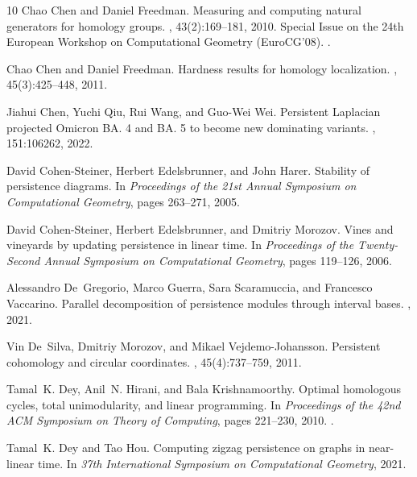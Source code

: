 \documentclass[10pt,a4paper]{amsart}
\theoremstyle{definition}
\theoremstyle{remark}
\begin{document}
\begin{thebibliography}{10}
Chao Chen and Daniel Freedman.
\newblock Measuring and computing natural generators for homology groups.
, 43(2):169--181, 2010.
\newblock Special Issue on the 24th European Workshop on Computational Geometry
  (EuroCG'08).
\newblock \href {https://doi.org/10.1016/j.comgeo.2009.06.004}
  {}.

Chao Chen and Daniel Freedman.
\newblock Hardness results for homology localization.
, 45(3):425--448, 2011.

Jiahui Chen, Yuchi Qiu, Rui Wang, and Guo-Wei Wei.
\newblock Persistent {L}aplacian projected {O}micron {BA. 4} and {BA. 5} to
  become new dominating variants.
, 151:106262, 2022.

David Cohen-Steiner, Herbert Edelsbrunner, and John Harer.
\newblock Stability of persistence diagrams.
\newblock In {\em Proceedings of the 21st Annual Symposium on Computational
  Geometry}, pages 263--271, 2005.

David Cohen-Steiner, Herbert Edelsbrunner, and Dmitriy Morozov.
\newblock Vines and vineyards by updating persistence in linear time.
\newblock In {\em Proceedings of the Twenty-Second Annual Symposium on
  Computational Geometry}, pages 119--126, 2006.

Alessandro De~Gregorio, Marco Guerra, Sara Scaramuccia, and Francesco
  Vaccarino.
\newblock Parallel decomposition of persistence modules through interval bases.
, 2021.

Vin De~Silva, Dmitriy Morozov, and Mikael Vejdemo-Johansson.
\newblock Persistent cohomology and circular coordinates.
, 45(4):737--759, 2011.

Tamal~K. Dey, Anil~N. Hirani, and Bala Krishnamoorthy.
\newblock Optimal homologous cycles, total unimodularity, and linear
  programming.
\newblock In {\em Proceedings of the 42nd ACM Symposium on Theory of
  Computing}, pages 221--230, 2010.
\newblock \href {https://doi.org/10.1145/1806689.1806721}
  {}.

Tamal~K. Dey and Tao Hou.
\newblock Computing zigzag persistence on graphs in near-linear time.
\newblock In {\em 37th International Symposium on Computational Geometry},
  2021.


\end{thebibliography}
\end{document}
